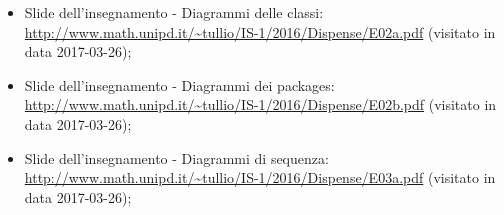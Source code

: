\begin{itemize}
\begin{itemize}
\begin{itemize}
	       \end{itemize}
	      \end{itemize}
	    \item Slide dell’insegnamento - Diagrammi delle classi:
	    \url{http://www.math.unipd.it/~tullio/IS-1/2016/Dispense/E02a.pdf} (visitato in data 2017-03-26);
	    \item Slide dell’insegnamento - Diagrammi dei packages:
	    \url{http://www.math.unipd.it/~tullio/IS-1/2016/Dispense/E02b.pdf} (visitato in data 2017-03-26);
	    \item Slide dell’insegnamento - Diagrammi di sequenza:
	    \url{http://www.math.unipd.it/~tullio/IS-1/2016/Dispense/E03a.pdf} (visitato in data 2017-03-26);
	  \end{itemize}
